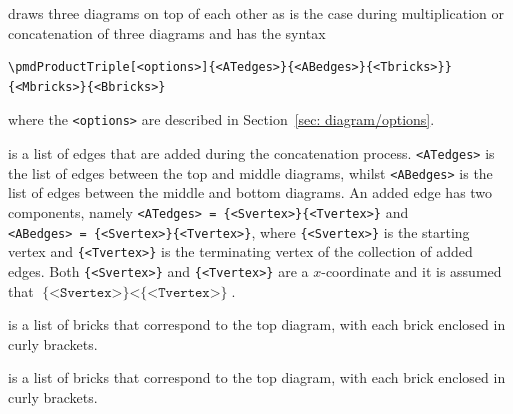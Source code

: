 \documentclass{ltxdoc}
\begin{document}
\DescribeMacro{\pmdProductTriple}
draws three diagrams on top of each other as is the case during multiplication or concatenation of three diagrams and has the syntax
\begin{verbatim}
\pmdProductTriple[<options>]{<ATedges>}{<ABedges>}{<Tbricks>}}{<Mbricks>}{<Bbricks>}
\end{verbatim}
where
the \texttt{<options>} are described in Section~\ref{sec: diagram/options}.

is a list of edges that are added during the concatenation process. \texttt{<ATedges>} is the list of edges between the top and middle diagrams, whilst \texttt{<ABedges>} is the list of edges between the middle and bottom diagrams. An added edge has two components, namely \texttt{<ATedges>~=~\{<Svertex>\}\{<Tvertex>\}} and \texttt{<ABedges>~=~\{<Svertex>\}\{<Tvertex>\}}, where \texttt{\{<Svertex>\}} is the starting vertex and \texttt{\{<Tvertex>\}} is the terminating vertex of the collection of added edges. Both \texttt{\{<Svertex>\}} and \texttt{\{<Tvertex>\}} are a \( x \)-coordinate and it is assumed that \( \texttt{\{<Svertex>\}} < \texttt{\{<Tvertex>\}} \).

is a list of bricks that correspond to the top diagram, with each brick enclosed in curly brackets.

is a list of bricks that correspond to the top diagram, with each brick enclosed in curly brackets.
\end{document}
